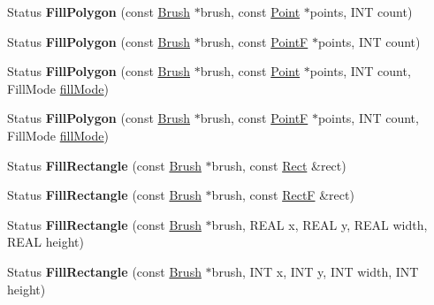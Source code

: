 \begin{DoxyCompactItemize}
Status {\bfseries Fill\+Polygon} (const \hyperlink{class_brush}{Brush} $\ast$brush, const \hyperlink{struct_point}{Point} $\ast$points, I\+NT count)
\item 
\mbox{\label{class_graphics_a4a40dac25ed24e54a54831585ec7e72f}} 
Status {\bfseries Fill\+Polygon} (const \hyperlink{class_brush}{Brush} $\ast$brush, const \hyperlink{struct_point_f}{PointF} $\ast$points, I\+NT count)
\item 
\mbox{\label{class_graphics_a7caadcd97899540584438030c0fa1822}} 
Status {\bfseries Fill\+Polygon} (const \hyperlink{class_brush}{Brush} $\ast$brush, const \hyperlink{struct_point}{Point} $\ast$points, I\+NT count, Fill\+Mode \hyperlink{interfacevoid}{fill\+Mode})
\item 
\mbox{\label{class_graphics_a23f6c6486e2e0e8a57ecf65710a45eb5}} 
Status {\bfseries Fill\+Polygon} (const \hyperlink{class_brush}{Brush} $\ast$brush, const \hyperlink{struct_point_f}{PointF} $\ast$points, I\+NT count, Fill\+Mode \hyperlink{interfacevoid}{fill\+Mode})
\item 
\mbox{\label{class_graphics_ab839af13e14ad65205efb98d247adc5b}} 
Status {\bfseries Fill\+Rectangle} (const \hyperlink{class_brush}{Brush} $\ast$brush, const \hyperlink{struct_rect}{Rect} \&rect)
\item 
\mbox{\label{class_graphics_ad65f2ffbf5269b231ea33d7b25a96293}} 
Status {\bfseries Fill\+Rectangle} (const \hyperlink{class_brush}{Brush} $\ast$brush, const \hyperlink{struct_rect_f}{RectF} \&rect)
\item 
\mbox{\label{class_graphics_af13fe0b2829380954c4faed771a860a1}} 
Status {\bfseries Fill\+Rectangle} (const \hyperlink{class_brush}{Brush} $\ast$brush, R\+E\+AL x, R\+E\+AL y, R\+E\+AL width, R\+E\+AL height)
\item 
\mbox{\label{class_graphics_abf1c69db81ae1f3cad001569e968eb70}} 
Status {\bfseries Fill\+Rectangle} (const \hyperlink{class_brush}{Brush} $\ast$brush, I\+NT x, I\+NT y, I\+NT width, I\+NT height)
\item 
\mbox{\label{class_graphics_a86ba262a74e3ccb87f32569925a4cc76}} 

\end{DoxyCompactItemize}
